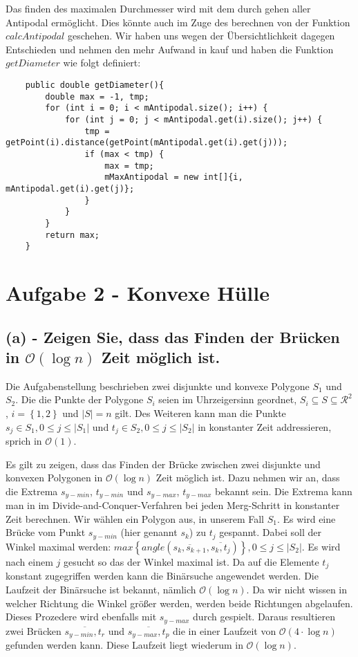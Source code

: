 \documentclass[a4paper]{article}
\begin{document}
Das finden des maximalen Durchmesser wird mit dem durch gehen aller Antipodal ermöglicht. Dies könnte auch im Zuge des berechnen von der Funktion $calcAntipodal$ geschehen. Wir haben uns wegen der Übersichtlichkeit dagegen Entschieden und nehmen den mehr Aufwand in kauf und haben die Funktion $getDiameter$ wie folgt definiert:

\begin{lstlisting}
	public double getDiameter(){
        double max = -1, tmp;
        for (int i = 0; i < mAntipodal.size(); i++) {
            for (int j = 0; j < mAntipodal.get(i).size(); j++) {
                tmp = getPoint(i).distance(getPoint(mAntipodal.get(i).get(j)));
                if (max < tmp) {
                    max = tmp;
                    mMaxAntipodal = new int[]{i, mAntipodal.get(i).get(j)};
                }
            }
        }
        return max;
    }
\end{lstlisting}

\section*{Aufgabe 2 - Konvexe Hülle}

\subsection*{(a) - Zeigen Sie, dass das Finden der Brücken in $\mathcal{O}(\log n)$ Zeit möglich ist.}

Die Aufgabenstellung beschrieben zwei disjunkte und konvexe Polygone $S_1$ und $S_2$. Die die Punkte der Polygone $S_i$ seien im Uhrzeigersinn geordnet, $S_i \subseteq S \subseteq \mathcal{R}^2$, $i = \left\{1, 2\right\}$ und $|S| = n$ gilt. Des Weiteren kann man die Punkte $s_j \in S_1, 0 \leq j \leq |S_1|$ und $t_j \in S_2, 0 \leq j \leq |S_2|$ in konstanter Zeit addressieren, sprich in $\mathcal{O}(1)$.

Es gilt zu zeigen, dass das Finden der Brücke zwischen zwei disjunkte und konvexen Polygonen in $\mathcal{O}(\log n)$ Zeit möglich ist. Dazu nehmen wir an, dass die Extrema $s_{y-min}$, $t_{y-min}$ und $s_{y-max}$, $t_{y-max}$ bekannt sein. Die Extrema kann man in im Divide-and-Conquer-Verfahren bei jeden Merg-Schritt in konstanter Zeit berechnen. Wir wählen ein Polygon aus, in unserem Fall $S_1$. Es wird eine Brücke vom Punkt $s_{y-min}$ (hier genannt $s_k$) zu $t_j$ gespannt. Dabei soll der Winkel maximal werden: $max \left\{angle\left(\overline{s_k,s_{k+1}},\overline{s_k,t_j}\right)\right\}, 0 \leq j \leq |S_2|$. Es wird nach einem $j$ gesucht so das der Winkel maximal ist. Da auf die Elemente $t_j$ konstant zugegriffen werden kann die Binärsuche angewendet werden. Die Laufzeit der Binärsuche ist bekannt, nämlich $\mathcal{O}(\log n)$. Da wir nicht wissen in welcher Richtung die Winkel größer werden, werden beide Richtungen abgelaufen. Dieses Prozedere wird ebenfalls mit $s_{y-max}$ durch gespielt. Daraus resultieren zwei Brücken $\overline{s_{y-min}, t_r}$ und $\overline{s_{y-max}, t_p}$ die in einer Laufzeit von $\mathcal{O}(4 \cdot \log n)$ gefunden werden kann. Diese Laufzeit liegt wiederum in $\mathcal{O}(\log n)$.
\end{document}
